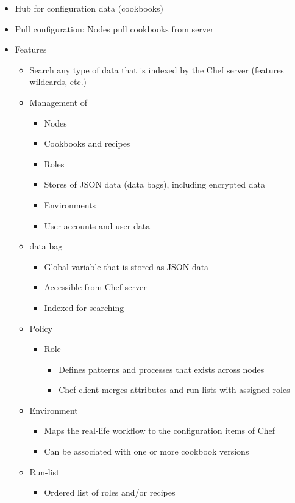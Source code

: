 \begin{itemize}
\begin{itemize}
\begin{itemize}
			\item Hub for configuration data (cookbooks)
			\item Pull configuration: Nodes pull cookbooks from server
			\item Features
			\begin{itemize}
				\item Search any type of data that is indexed by the Chef server (features wildcards, etc.)
				\item Management of
				\begin{itemize}
					\item Nodes
					\item Cookbooks and recipes
					\item Roles
					\item Stores of JSON data (data bags), including encrypted data
					\item Environments
					\item User accounts and user data
				\end{itemize}
				\item data bag
				\begin{itemize}
					\item Global variable that is stored as JSON data
					\item Accessible from Chef server
					\item Indexed for searching
				\end{itemize}
				\item Policy
				\begin{itemize}
					\item Role
					\begin{itemize}
						\item Defines patterns and processes that exists across nodes
						\item Chef client merges attributes and run-lists with assigned roles
					\end{itemize}
				\end{itemize}
				\item Environment
				\begin{itemize}
					\item Maps the real-life workflow to the configuration items of Chef
					\item Can be associated with one or more cookbook versions
				\end{itemize}
				\item Run-list
				\begin{itemize}
					\item Ordered list of roles and/or recipes

\end{itemize}
\end{itemize}
\end{itemize}
\end{itemize}
\end{itemize}
